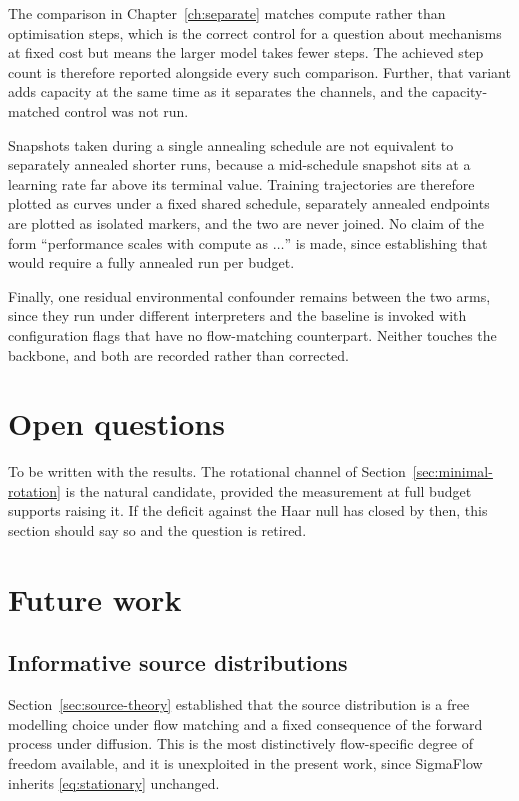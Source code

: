 \documentclass[11pt,a4paper]{report}
\theoremstyle{plain}
\theoremstyle{definition}
\theoremstyle{remark}
\newenvironment{reserved}[1]{%
    \begin{tcolorbox}[
      enhanced, breakable,
      colback=PanelGrey, colframe=DraftBlue,
      boxrule=0.5pt, left=6pt,right=6pt,top=5pt,bottom=5pt,
      fonttitle=\bfseries\small\sffamily,
      title={RESERVED \textendash\ #1}]
      \small\sffamily
  }{%
    \end{tcolorbox}
  }
\newenvironment{reserved}[1]{\setbox0=\vbox\bgroup}{\egroup}
\begin{document}
The comparison in Chapter~\ref{ch:separate} matches compute rather than
optimisation steps, which is the correct control for a question about
mechanisms at fixed cost but means the larger model takes fewer steps. The
achieved step count is therefore reported alongside every such comparison.
Further, that variant adds capacity at the same time as it separates the
channels, and the capacity-matched control was not run.

Snapshots taken during a single annealing schedule are not equivalent to
separately annealed shorter runs, because a mid-schedule snapshot sits at a
learning rate far above its terminal value. Training trajectories are therefore
plotted as curves under a fixed shared schedule, separately annealed endpoints
are plotted as isolated markers, and the two are never joined. No claim of the
form ``performance scales with compute as $\ldots$'' is made, since
establishing that would require a fully annealed run per budget.

Finally, one residual environmental confounder remains between the two arms,
since they run under different interpreters and the baseline is invoked with
configuration flags that have no flow-matching counterpart. Neither touches the
backbone, and both are recorded rather than corrected.

\section{Open questions}
\label{sec:discussion-open}

\begin{reserved}{Open questions arising from the results}
To be written with the results. The rotational channel of
Section~\ref{sec:minimal-rotation} is the natural candidate, provided the
measurement at full budget supports raising it. If the deficit against the Haar
null has closed by then, this section should say so and the question is
retired.
\end{reserved}

\section{Future work}

\subsection{Informative source distributions}
\label{sec:future-source}

Section~\ref{sec:source-theory} established that the source distribution is a
free modelling choice under flow matching and a fixed consequence of the
forward process under diffusion. This is the most distinctively flow-specific
degree of freedom available, and it is unexploited in the present work, since
SigmaFlow inherits \eqref{eq:stationary} unchanged.
\end{document}
